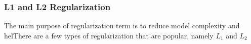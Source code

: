 \subsubsection{L1 and L2 Regularization}

The main purpose of regularization term is to reduce model complexity and helThere are a few types of regularization that are popular, namely $L_1$ and $L_2$